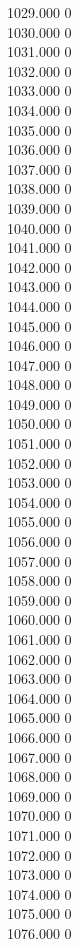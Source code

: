 { 1029.000	0 \\
 1030.000	0 \\
 1031.000	0 \\
 1032.000	0 \\
 1033.000	0 \\
 1034.000	0 \\
 1035.000	0 \\
 1036.000	0 \\
 1037.000	0 \\
 1038.000	0 \\
 1039.000	0 \\
 1040.000	0 \\
 1041.000	0 \\
 1042.000	0 \\
 1043.000	0 \\
 1044.000	0 \\
 1045.000	0 \\
 1046.000	0 \\
 1047.000	0 \\
 1048.000	0 \\
 1049.000	0 \\
 1050.000	0 \\
 1051.000	0 \\
 1052.000	0 \\
 1053.000	0 \\
 1054.000	0 \\
 1055.000	0 \\
 1056.000	0 \\
 1057.000	0 \\
 1058.000	0 \\
 1059.000	0 \\
 1060.000	0 \\
 1061.000	0 \\
 1062.000	0 \\
 1063.000	0 \\
 1064.000	0 \\
 1065.000	0 \\
 1066.000	0 \\
 1067.000	0 \\
 1068.000	0 \\
 1069.000	0 \\
 1070.000	0 \\
 1071.000	0 \\
 1072.000	0 \\
 1073.000	0 \\
 1074.000	0 \\
 1075.000	0 \\
 1076.000	0 \\
}
